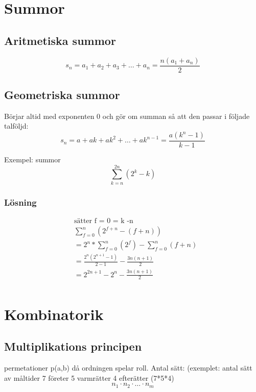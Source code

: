 \begin{multicols}{2}
\section{Summor}
\subsection{Aritmetiska summor}
\begin{equation*}
s _ { n } = a _ { 1 } + a _ { 2 } + a _ { 3 } + \ldots + a _ { n } = \frac { n \left( a _ { 1 } + a _ { n } \right) } { 2 }
\end{equation*}


\subsection{Geometriska summor}
Börjar altid med exponenten 0 och gör om summan så att den passar i följade talföljd:
\begin{equation*}
s _ { n } = a + a k + a k ^ { 2 } + \ldots + a k ^ { n - 1 } = \frac { a \left( k ^ { n } - 1 \right) } { k - 1 }
\end{equation*}


\begin{exampleblock}{Exempel: summor}
\begin{equation*}
\displaystyle\sum _ { k = n } ^ { 2n } (2^{k} - k)
\end{equation*}
\subsubsection{Lösning}
\begin{align*}
  &\text{sätter f = 0 = k -n} \\
  &\displaystyle\sum _ { f = 0 } ^ { n } (2^{f+n} - (f+n)) \\
  &= 2^{n} * \displaystyle\sum _ { f = 0 } ^ { n } (2^{f}) - \displaystyle\sum _ { f = 0 } ^ { n } (f+n) \\
  &=\frac{2^{n} (2^{n+1} -1)}{2-1} - \frac{3n(n+1)}{2} \\
  &= 2^{2n+1} - 2^{n} - \frac{3n(n+1)}{2}\\
\end{align*}
\end{exampleblock}


\section{Kombinatorik}
\subsection{Multiplikations principen}
permetationer p(a,b) då ordningen spelar roll.
Antal sätt: (exemplet: antal sätt av måltider 7 företer 5 varmrätter 4 efterätter (7*5*4)
\begin{equation*}
n _ { 1 } \cdot n _ { 2 } \cdot \ldots \cdot n _ { m }
\end{equation*}



\end{multicols}
